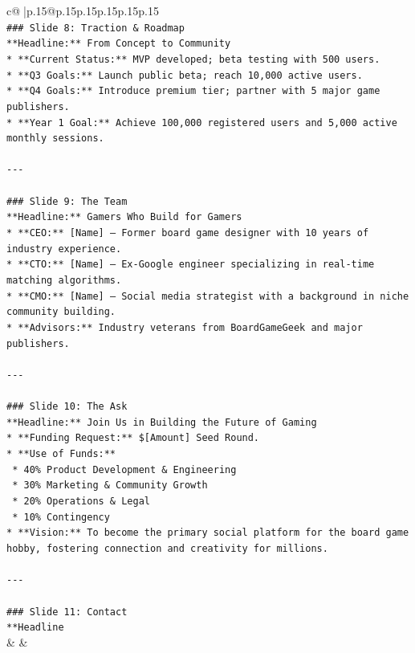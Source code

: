 \documentclass{article}
\begin{document}
{\begin{supertabular}{c@{$\;$}|p{.15\linewidth}@{}p{.15\linewidth}p{.15\linewidth}p{.15\linewidth}p{.15\linewidth}p{.15\linewidth}}
{{{\\ 
\texttt{\#\#\# Slide 8: Traction \& Roadmap} \\
\texttt{**Headline:** From Concept to Community} \\
\texttt{*   **Current Status:** MVP developed; beta testing with 500 users.} \\
\texttt{*   **Q3 Goals:** Launch public beta; reach 10,000 active users.} \\
\texttt{*   **Q4 Goals:** Introduce premium tier; partner with 5 major game publishers.} \\
\texttt{*   **Year 1 Goal:** Achieve 100,000 registered users and 5,000 active monthly sessions.} \\
\\ 
\texttt{{-}{-}{-}} \\
\\ 
\texttt{\#\#\# Slide 9: The Team} \\
\texttt{**Headline:** Gamers Who Build for Gamers} \\
\texttt{*   **CEO:** {[}Name{]} – Former board game designer with 10 years of industry experience.} \\
\texttt{*   **CTO:** {[}Name{]} – Ex{-}Google engineer specializing in real{-}time matching algorithms.} \\
\texttt{*   **CMO:** {[}Name{]} – Social media strategist with a background in niche community building.} \\
\texttt{*   **Advisors:** Industry veterans from BoardGameGeek and major publishers.} \\
\\ 
\texttt{{-}{-}{-}} \\
\\ 
\texttt{\#\#\# Slide 10: The Ask} \\
\texttt{**Headline:** Join Us in Building the Future of Gaming} \\
\texttt{*   **Funding Request:** \${[}Amount{]} Seed Round.} \\
\texttt{*   **Use of Funds:**} \\
\texttt{    *   40\% Product Development \& Engineering} \\
\texttt{    *   30\% Marketing \& Community Growth} \\
\texttt{    *   20\% Operations \& Legal} \\
\texttt{    *   10\% Contingency} \\
\texttt{*   **Vision:** To become the primary social platform for the board game hobby, fostering connection and creativity for millions.} \\
\\ 
\texttt{{-}{-}{-}} \\
\\ 
\texttt{\#\#\# Slide 11: Contact} \\
\texttt{**Headline} \\
            }
        }
    }
    & & \\ \\


\end{supertabular}}
\end{document}
